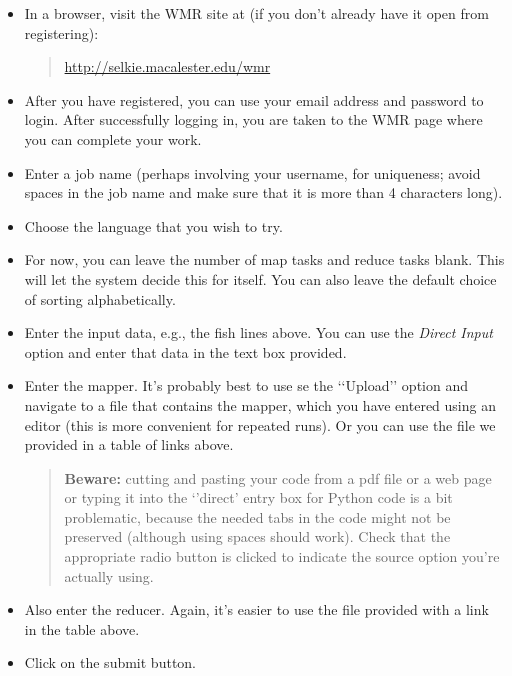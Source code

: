 \documentclass[letterpaper,10pt,openany,oneside]{sphinxmanual}
\begin{document}
\begin{itemize}
\item {} 
In a browser, visit the WMR site at (if you don't already have it
open from registering):
\begin{quote}

\href{http://selkie.macalester.edu/wmr}{http://selkie.macalester.edu/wmr}
\end{quote}

\item {} 
After you have registered, you can use your email address and
password to login. After successfully logging in, you are taken to
the WMR page where you can complete your work.

\item {} 
Enter a job name (perhaps involving your username, for uniqueness;
avoid spaces in the job name and make sure that it is more than 4
characters long).

\item {} 
Choose the language that you wish to try.

\item {} 
For now, you can leave the number of map tasks and reduce tasks
blank. This will let the system decide this for itself. You can
also leave the default choice of sorting alphabetically.

\item {} 
Enter the input data, e.g., the fish lines above. You can use the
\emph{Direct Input} option and enter that data in the text box
provided.

\item {} 
Enter the mapper. It's probably best to use se the {}`{}`Upload''
option and navigate to a file that contains the mapper, which you
have entered using an editor (this is more convenient for repeated
runs). Or you can use the file we provided in a table of links above.
\begin{quote}

\textbf{Beware:} cutting and pasting your code from a pdf file or
a web page or typing it into the {}`'direct' entry box for Python
code is a bit problematic, because the needed tabs in the code
might not be preserved (although using spaces should work). Check
that the appropriate radio button is clicked to indicate the source
option you're actually using.
\end{quote}

\item {} 
Also enter the reducer.  Again, it's easier to use the file provided
with a link in the table above.

\item {} 
Click on the submit button.

\end{itemize}
\end{document}
